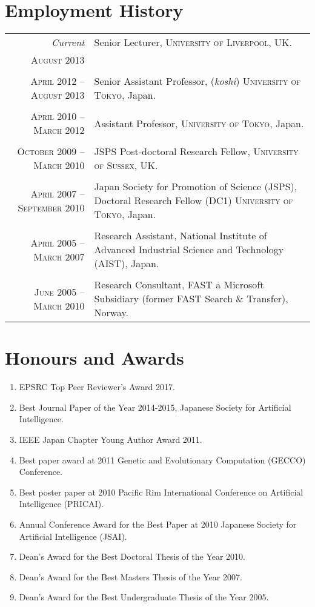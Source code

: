 \documentclass[a4paper,11pt]{article}
\begin{document}
\section{Employment History}
\begin{tabular}{r|p{11cm}}
 \emph{Current} & Senior Lecturer, \textsc{University of Liverpool}, UK. \\\textsc{August 2013} \\\multicolumn{2}{c}{} \\
 \textsc{April 2012 -- August 2013} & Senior Assistant Professor, (\emph{koshi})  \textsc{University of Tokyo}, Japan. \\\multicolumn{2}{c}{} \\
\textsc{April 2010 -- March 2012} & Assistant Professor, \textsc{University of Tokyo}, Japan. \\\multicolumn{2}{c}{} \\
\textsc{October 2009 -- March 2010} & JSPS Post-doctoral Research Fellow, \textsc{University of Sussex}, UK. \\\multicolumn{2}{c}{} \\
\textsc{April 2007 -- September 2010} & Japan Society for Promotion of Science (JSPS), Doctoral Research Fellow (DC1) \textsc{University of Tokyo}, Japan. \\\multicolumn{2}{c}{} \\
\textsc{April 2005 -- March 2007} & Research Assistant, \textsf{National Institute of Advanced Industrial Science and Technology} (AIST), Japan. \\\multicolumn{2}{c}{} \\
\textsc{June 2005 -- March 2010} & Research Consultant, \textsf{FAST a Microsoft Subsidiary} (former FAST Search \& Transfer), Norway.
\end{tabular}

%

\section{Honours and Awards}

\begin{enumerate}
\item EPSRC Top Peer Reviewer's Award 2017.
\item Best Journal Paper of the Year 2014-2015, Japanese Society for Artificial Intelligence.
\item IEEE Japan Chapter Young Author Award 2011.
\item Best paper award at 2011 Genetic and Evolutionary Computation (GECCO) Conference.
\item Best poster paper at 2010 Pacific Rim International Conference on Artificial Intelligence (PRICAI).
\item Annual Conference Award for the Best Paper at 2010 Japanese Society for Artificial Intelligence (JSAI).
\item Dean’s Award for the Best Doctoral Thesis of the Year 2010.
\item Dean’s Award for the Best Masters Thesis of the Year 2007.
\item Dean’s Award for the Best Undergraduate Thesis of the Year 2005.
\end{enumerate}
\end{document}
